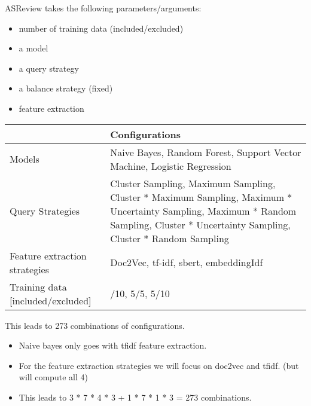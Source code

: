 \documentclass[12pt,twoside]{reedthesis}
\providecommand{\tightlist}{%
  \setlength{\itemsep}{0pt}\setlength{\parskip}{0pt}}
\begin{document}
ASReview takes the following parameters/arguments:
\begin{itemize}
\tightlist
\item
  number of training data (included/excluded)
\item
  a model
\item
  a query strategy
\item
  a balance strategy (fixed)
\item
  feature extraction
\end{itemize}
\begin{table}[H]
\centering
\begin{tabular}{l>{\raggedright\arraybackslash}p{30em}}
\toprule
  & Configurations\\
\midrule
Models & Naive Bayes, Random Forest, Support Vector Machine, Logistic Regression\\
Query Strategies & Cluster Sampling, Maximum Sampling, Cluster * Maximum  Sampling, Maximum * Uncertainty Sampling, Maximum * Random Sampling, Cluster * Uncertainty Sampling, Cluster * Random Sampling\\
Feature extraction strategies & Doc2Vec, tf-idf, sbert, embeddingIdf\\
Training data [included/excluded] & 10/10, 5/5, 5/10\\
\bottomrule
\end{tabular}
\end{table}
This leads to 273 combinations of configurations.
\begin{itemize}
\tightlist
\item
  Naive bayes only goes with tfidf feature extraction.
\item
  For the feature extraction strategies we will focus on doc2vec and tfidf. (but will compute all 4)
\item
  This leads to 3 * 7 * 4 * 3 + 1 * 7 * 1 * 3 = 273 combinations.
\end{itemize}
\end{document}
